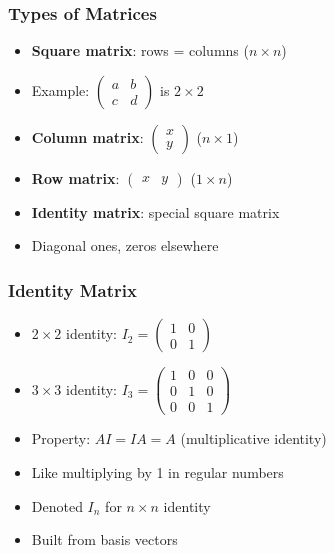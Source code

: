 \begin{frame}[fragile]\frametitle{Types of Matrices}
  \begin{itemize}
    \item \textbf{Square matrix}: rows = columns ($n \times n$)
    \item Example: $\begin{pmatrix} a & b \\ c & d \end{pmatrix}$ is $2 \times 2$
    \item \textbf{Column matrix}: $\begin{pmatrix} x \\ y \end{pmatrix}$ ($n \times 1$)
    \item \textbf{Row matrix}: $\begin{pmatrix} x & y \end{pmatrix}$ ($1 \times n$)
    \item \textbf{Identity matrix}: special square matrix
    \item Diagonal ones, zeros elsewhere
  \end{itemize}
\end{frame}

\begin{frame}[fragile]\frametitle{Identity Matrix}
  \begin{itemize}
    \item $2 \times 2$ identity: $I_2 = \begin{pmatrix} 1 & 0 \\ 0 & 1 \end{pmatrix}$
    \item $3 \times 3$ identity: $I_3 = \begin{pmatrix} 1 & 0 & 0 \\ 0 & 1 & 0 \\ 0 & 0 & 1 \end{pmatrix}$
    \item Property: $AI = IA = A$ (multiplicative identity)
    \item Like multiplying by 1 in regular numbers
    \item Denoted $I_n$ for $n \times n$ identity
    \item Built from basis vectors
  \end{itemize}
\end{frame}

